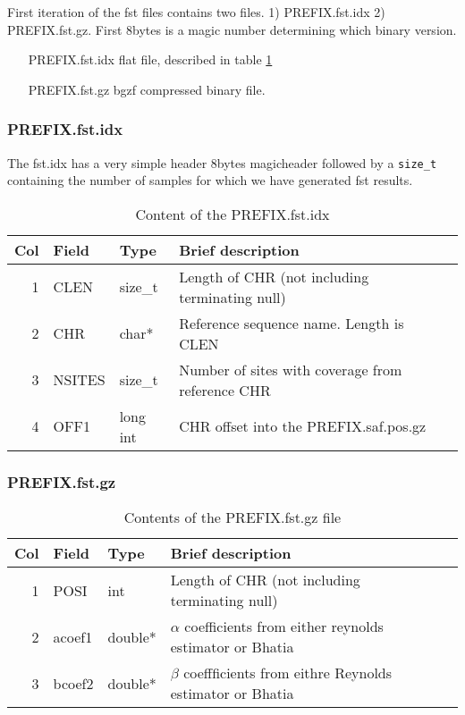 \documentclass[10pt]{article}
\begin{document}
First iteration of the fst files contains two files. 1) PREFIX.fst.idx 2) PREFIX.fst.gz.
First 8bytes is a magic number determining which binary version.


\begin{itemize}
\item[PREFIX.fst.idx] flat file, described in table \ref{tab2}
\item[PREFIX.fst.gz] bgzf compressed binary file.
\end{itemize}
\subsubsection{PREFIX.fst.idx}
The fst.idx has a very simple header 8bytes magicheader followed by a \texttt{size\_t} containing the number of samples for which we have generated fst results.
\begin{table}[h]
\begin{tabular}{rllll}
  \hline
  {\bf Col} & {\bf Field} & {\bf Type} & {\bf Brief description} \\
  \hline
  1 & {\sf CLEN} & size\_t &  Length of CHR (not including terminating null)\\
  2 & {\sf CHR} & char* & Reference sequence name. Length is CLEN\\
  3 & {\sf NSITES} & size\_t & Number of sites with coverage from reference CHR\\
  4 & {\sf OFF1} & long int & CHR offset into the PREFIX.saf.pos.gz \\
  \hline
\end{tabular}\label{tab2}
\caption{Content of the PREFIX.fst.idx}
\end{table}
\subsubsection{PREFIX.fst.gz}
\begin{table}[h]
\begin{tabular}{rllll}
  \hline
  {\bf Col} & {\bf Field} & {\bf Type} & {\bf Brief description} \\
  \hline
  1 & {\sf POSI} & int &  Length of CHR (not including terminating null)\\
  2 & {\sf acoef1} & double* & $\alpha$ coefficients from either reynolds estimator or Bhatia \\
  3 & {\sf bcoef2} & double* & $\beta$ coeffficients from eithre Reynolds estimator or Bhatia\\
  \hline
\end{tabular}\label{tabfstgz}
\caption{Contents of the PREFIX.fst.gz file}
\end{table}
\end{document}
